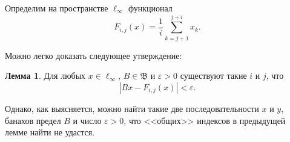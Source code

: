 \documentclass[a4paper,openbib]{report}
\theoremstyle{definition}
\newtheorem{lemma}{Лемма}%
\begin{document}
Определим на пространстве $\ell_\infty$ функционал
\begin{equation}
	F_{i,j} (x) =\frac{1}{i} \sum_{k=j+1}^{j+i} x_k
	.
\end{equation}

Можно легко доказать следующее утверждение:

\begin{lemma}
	Для любых $x\in\ell_\infty$, $B\in\mathfrak{B}$ и $\varepsilon>0$ существуют такие $i$ и $j$,
	что
	\begin{equation}
		\label{eq:sucheston_approx_epsilon}
		|Bx - F_{i,j}(x)| < \varepsilon
		.
	\end{equation}
\end{lemma}

Однако, как выясняется, можно найти такие две последовательности $x$ и $y$,
банахов предел $B$ и число $\varepsilon>0$, что <<общих>> индексов в предыдущей лемме найти не удастся.
\end{document}
